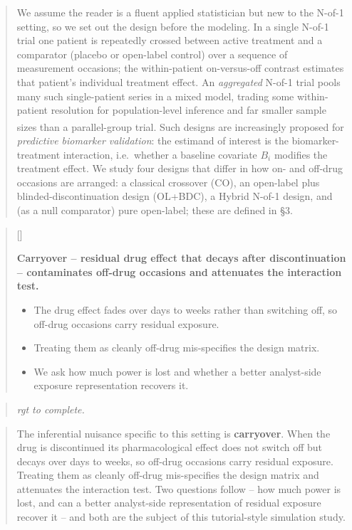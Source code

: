 \documentclass[
  11pt,
]{article}
\newcounter{pgraph}
\newenvironment{bullets}{%
  \stepcounter{pgraph}%
  \begin{quote}\small\sffamily\color[gray]{0.30}%
  {\normalfont\scriptsize\color[gray]{0.58}[\thepgraph]\enspace}}{%
  \end{quote}}
\newenvironment{rgt}{%
  \begin{quote}\small\itshape\color[RGB]{20,60,160}}{%
  \end{quote}}
\newenvironment{orig}{%
  \begin{quote}\normalsize\color[gray]{0.55}}{%
  \end{quote}}
\begin{document}
\begin{orig}
We assume the reader is a fluent applied statistician but new to the
N-of-1 setting, so we set out the design before the modeling. In a
single N-of-1 trial one patient is repeatedly crossed between active
treatment and a comparator (placebo or open-label control) over a
sequence of measurement occasions; the within-patient on-versus-off
contrast estimates that patient's individual treatment effect. An
\emph{aggregated} N-of-1 trial pools many such single-patient series in a
mixed model, trading some within-patient resolution for
population-level inference and far smaller sample sizes than a
parallel-group trial\textsuperscript{}. Such designs are
increasingly proposed for \emph{predictive biomarker validation}: the
estimand of interest is the biomarker-treatment interaction,
i.e.~whether a baseline covariate \(B_i\) modifies the treatment
effect. We study four designs that differ in how on- and off-drug
occasions are arranged: a classical crossover (CO), an open-label
plus blinded-discontinuation design (OL+BDC), a Hybrid N-of-1
design, and (as a null comparator) pure open-label; these are
defined in §3.

\end{orig}

\begin{bullets}

\textbf{Carryover -- residual drug effect that decays after
discontinuation -- contaminates off-drug occasions and attenuates
the interaction test.}

\begin{itemize}\setlength{\itemsep}{2pt}\setlength{\parskip}{0pt}
\item The drug effect fades over days to weeks rather than switching
off, so off-drug occasions carry residual exposure.
\item Treating them as cleanly off-drug mis-specifies the design
matrix.
\item We ask how much power is lost and whether a better analyst-side
exposure representation recovers it.
\end{itemize}

\end{bullets}

\begin{rgt}
rgt to complete.

\end{rgt}

\begin{orig}
The inferential nuisance specific to this setting is \textbf{carryover}.
When the drug is discontinued its pharmacological effect does not
switch off but decays over days to weeks, so off-drug occasions
carry residual exposure. Treating them as cleanly off-drug
mis-specifies the design matrix and attenuates the interaction test.
Two questions follow -- how much power is lost, and can a better
analyst-side representation of residual exposure recover it -- and
both are the subject of this tutorial-style simulation study.

\end{orig}
\end{document}

